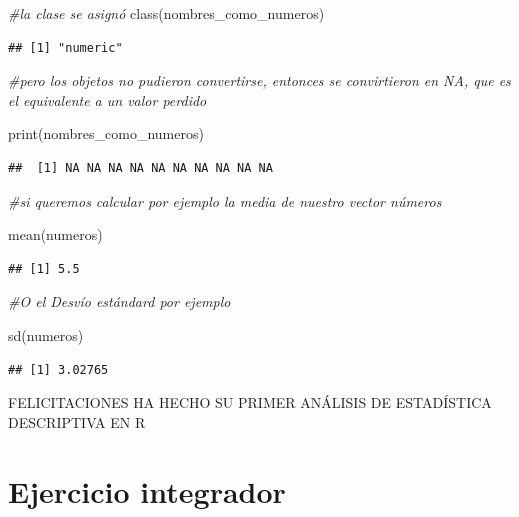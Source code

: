 \documentclass[
]{book}
\newenvironment{Shaded}{\begin{snugshade}}{\end{snugshade}}
\newcommand{\CommentTok}[1]{\textcolor[rgb]{0.56,0.35,0.01}{\textit{#1}}}
\newcommand{\FunctionTok}[1]{\textcolor[rgb]{0.00,0.00,0.00}{#1}}
\newcommand{\NormalTok}[1]{#1}
\begin{document}
\begin{Shaded}
\begin{Highlighting}[]
\CommentTok{\#la clase se asignó}
\FunctionTok{class}\NormalTok{(nombres\_como\_numeros)}
\end{Highlighting}
\end{Shaded}

\begin{verbatim}
## [1] "numeric"
\end{verbatim}

\begin{Shaded}
\begin{Highlighting}[]
\CommentTok{\#pero los objetos no pudieron convertirse, entonces se convirtieron en NA, que es el equivalente a un valor perdido}

\FunctionTok{print}\NormalTok{(nombres\_como\_numeros)}
\end{Highlighting}
\end{Shaded}

\begin{verbatim}
##  [1] NA NA NA NA NA NA NA NA NA NA
\end{verbatim}

\begin{Shaded}
\begin{Highlighting}[]
\CommentTok{\#si queremos calcular por ejemplo la media de nuestro vector números}

\FunctionTok{mean}\NormalTok{(numeros)}
\end{Highlighting}
\end{Shaded}

\begin{verbatim}
## [1] 5.5
\end{verbatim}

\begin{Shaded}
\begin{Highlighting}[]
\CommentTok{\#O el Desvío estándard por ejemplo}

\FunctionTok{sd}\NormalTok{(numeros)}
\end{Highlighting}
\end{Shaded}

\begin{verbatim}
## [1] 3.02765
\end{verbatim}

FELICITACIONES HA HECHO SU PRIMER ANÁLISIS DE ESTADÍSTICA DESCRIPTIVA EN R

\hypertarget{ejercicio-integrador}{%
\section{\texorpdfstring{ Ejercicio integrador}{ Ejercicio integrador}}\label{ejercicio-integrador}}
\end{document}
